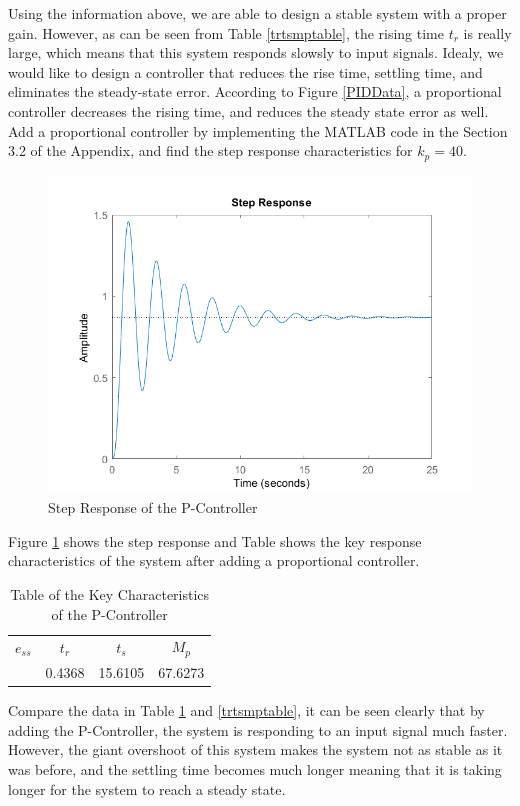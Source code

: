 \documentclass[a4paper, twocolumn, titlepage, 10pt]{article}
\begin{document}
		Using the information above, we are able to design a stable system with a proper gain. However, as can be seen from Table \ref{trtsmptable}, the rising time $t_r$ is really large, which means that this system responds slowsly to input signals. Idealy, we would like to design a controller that reduces the rise time, settling time, and eliminates the steady-state error. According to Figure \ref{PIDData}, a proportional controller decreases the rising time, and reduces the steady state error as well. Add a proportional controller by implementing the MATLAB code in the Section 3.2 of the Appendix, and find the step response characteristics for $k_p = 40$.
		\begin{figure}[H]
			\centering
			\includegraphics[width=\linewidth]{StepPC}
			\caption{Step Response of the P-Controller}
			\label{steppc}
		\end{figure}
		
		Figure \ref{steppc} shows the step response and Table shows the key response characteristics of the system after adding a proportional controller. 
		\begin{table}[H]
			\centering
			\begin{tabular}{c c c c}
				$e_{ss}$ & $t_r$ & $t_s$ & $M_p$ \\
				& 0.4368 & 15.6105 & 67.6273
			\end{tabular}
			\caption{Table of the Key Characteristics of the P-Controller}
			\label{responseCharPC}
		\end{table}
		
		Compare the data in Table \ref{responseCharPC} and \ref{trtsmptable}, it can be seen clearly that by adding the P-Controller, the system is responding to an input signal much faster. However, the giant overshoot of this system makes the system not as stable as it was before, and the settling time becomes much longer meaning that it is taking longer for the system to reach a steady state.
\end{document}
